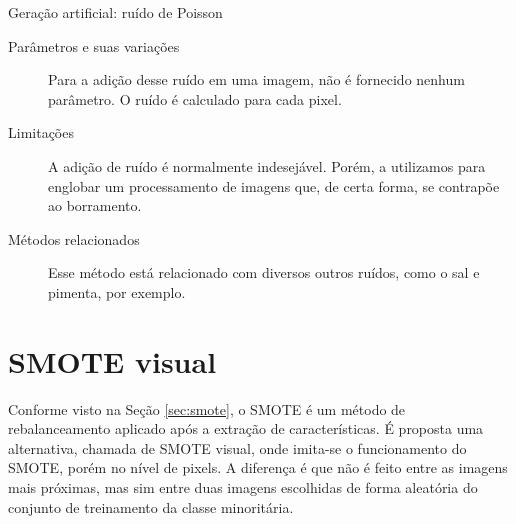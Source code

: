 \vspace{0.5cm}
\begin{algorithm}[!htbp]
  \caption{Geração artificial: ruído de Poisson}
  \label{alg:noise}
  \SetAlgoLined

\end{algorithm}
\vspace{0.5cm}

\begin{description}
  \item[Parâmetros e suas variações] Para a adição desse ruído em uma imagem, não é fornecido nenhum parâmetro. O ruído é calculado para cada pixel.
  \item[Limitações] A adição de ruído é normalmente indesejável. Porém, a utilizamos para englobar um processamento de imagens que, de certa forma, se contrapõe ao borramento.
  \item[Métodos relacionados] Esse método está relacionado com diversos outros ruídos, como o sal e pimenta, por exemplo.
\end{description}
\section{SMOTE visual}

Conforme visto na Seção \ref{sec:smote}, o SMOTE é um método de rebalanceamento aplicado após a extração de características. É proposta uma alternativa, chamada de SMOTE visual, onde imita-se o funcionamento do SMOTE, porém no nível de pixels. A diferença é que não é feito entre as imagens mais próximas, mas sim entre duas imagens escolhidas de forma aleatória do conjunto de treinamento da classe minoritária.

